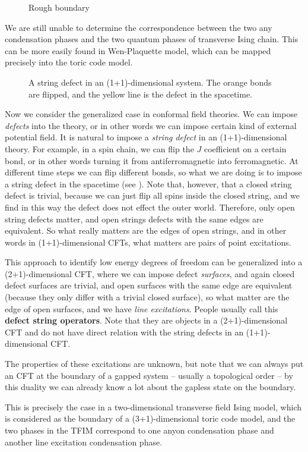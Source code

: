 \documentclass[hyperref, a4paper]{article}
\newcommand*{\concept}[1]{{\textbf{#1}}}
\begin{document}
\begin{figure}
    \centering
    
    \caption{Rough boundary}
    \label{fig:rough}
\end{figure}

We are still unable to determine the correspondence between the two any condensation phases and the two quantum
phases of transverse Ising chain. This can be more easily found in Wen-Plaquette model, which can be mapped 
precisely into the toric code model. 

\begin{figure}
    \centering
    
    \caption{A string defect in an (1+1)-dimensional system. The orange bonds are flipped, and the yellow line is the defect in the spacetime.}
    \label{fig:defect-string-1d}
\end{figure}

Now we consider the generalized case in conformal field theories. We can impose \emph{defects} into the theory,
or in other words we can impose certain kind of external potential field. It is natural to impose a 
\emph{string defect} in an (1+1)-dimensional theory. For example, in a spin chain, we can flip the $J$ coefficient
on a certain bond, or in other words turning it from antiferromagnetic into ferromagnetic. At different 
time steps we can flip different bonds, so what we are doing is to impose a string defect in the spacetime 
(see ). Note that, however, that a closed string defect is trivial, because we can 
just flip all spins inside the closed string, and we find in this way the defect does not effect the outer world.
Therefore, only open string defects matter, and open strings defects with the same edges are equivalent. 
So what really matters are the edges of open strings, and in other words in (1+1)-dimensional CFTs, what matters
are pairs of point excitations.

This approach to identify low energy degrees of freedom can be generalized into a (2+1)-dimensional CFT, 
where we can impose defect \emph{surfaces}, and again closed defect surfaces are trivial, and open 
surfaces with the same edge are equivalent (because they only differ with a trivial closed surface), 
so what matter are the edge of open surfaces, and we have \emph{line excitations}. People usually call 
this \concept{defect string operators}. Note that they are objects in a (2+1)-dimensional CFT and do not 
have direct relation with the string defects in an (1+1)-dimensional CFT.

The properties of these excitations are unknown, but note that we can always put an CFT at the boundary of a 
gapped system -- usually a topological order -- by this duality we can already know a lot about the gapless 
state on the boundary.

This is precisely the case in a two-dimensional transverse field Ising model, which is considered as the boundary 
of a (3+1)-dimensional toric code model, and the two phases in the TFIM correspond to one anyon condensation phase 
and another line excitation condensation phase.  
\end{document}
